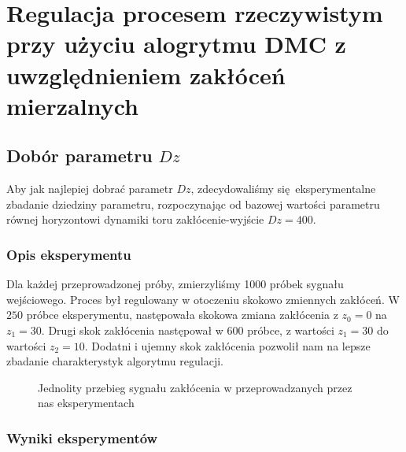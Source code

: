 \chapter{Regulacja procesem rzeczywistym przy użyciu alogrytmu DMC z uwzględnieniem zakłóceń mierzalnych}
\label{lab5}

\section{Dobór parametru $Dz$}
\label{lab5_dobor_Dz}
Aby jak najlepiej dobrać parametr $Dz$, zdecydowaliśmy się eksperymentalne 
zbadanie dziedziny parametru, rozpoczynając od bazowej wartości parametru równej
horyzontowi dynamiki toru zakłócenie-wyjście $Dz = \num{400}$. 

\subsection{Opis eksperymentu}
\label{lab5_opis}
Dla każdej przeprowadzonej próby, zmierzyliśmy 1000 próbek sygnału wejściowego. Proces był
regulowany w otoczeniu skokowo zmiennych zakłóceń. W $\num{250}$ próbce eksperymentu, następowała
skokowa zmiana zakłócenia z $z_{0} = \num{0}$ na $z_{1} = \num{30}$. Drugi skok zakłócenia następował
w $\num{600}$ próbce, z wartości $z_{1} = \num{30}$ do wartości $z_{2} = \num{10}$. Dodatni i ujemny skok
zakłócenia pozwolił nam na lepsze zbadanie charakterystyk algorytmu regulacji.

\begin{figure}[b]
    \centering
    \caption{Jednolity przebieg sygnału zakłócenia w przeprowadzanych przez nas eksperymentach}
    \label{zad5_lab_zaklocenia}
\end{figure}

\subsection{Wyniki eksperymentów}
\label{zad5_wyniki}
